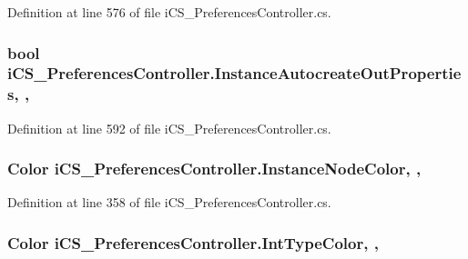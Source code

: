 Definition at line 576 of file i\+C\+S\+\_\+\+Preferences\+Controller.\+cs.

\hypertarget{classi_c_s___preferences_controller_a4496b861761f89fdc6a8647192368ead}{
\subsubsection[{Instance\+Autocreate\+Out\+Properties}]{\setlength{\rightskip}{0pt plus 5cm}bool i\+C\+S\+\_\+\+Preferences\+Controller.\+Instance\+Autocreate\+Out\+Properties\hspace{0.3cm}{\ttfamily [static]}, {\ttfamily [get]}, {\ttfamily [set]}}}\label{classi_c_s___preferences_controller_a4496b861761f89fdc6a8647192368ead}


Definition at line 592 of file i\+C\+S\+\_\+\+Preferences\+Controller.\+cs.

\hypertarget{classi_c_s___preferences_controller_aaf64f0db4d688dcc7c12a9711f04d04f}{
\subsubsection[{Instance\+Node\+Color}]{\setlength{\rightskip}{0pt plus 5cm}Color i\+C\+S\+\_\+\+Preferences\+Controller.\+Instance\+Node\+Color\hspace{0.3cm}{\ttfamily [static]}, {\ttfamily [get]}, {\ttfamily [set]}}}\label{classi_c_s___preferences_controller_aaf64f0db4d688dcc7c12a9711f04d04f}


Definition at line 358 of file i\+C\+S\+\_\+\+Preferences\+Controller.\+cs.

\hypertarget{classi_c_s___preferences_controller_a5e056119409ce6e8877cf05cf6d0d0de}{
\subsubsection[{Int\+Type\+Color}]{\setlength{\rightskip}{0pt plus 5cm}Color i\+C\+S\+\_\+\+Preferences\+Controller.\+Int\+Type\+Color\hspace{0.3cm}{\ttfamily [static]}, {\ttfamily [get]}, {\ttfamily [set]}}}\label{classi_c_s___preferences_controller_a5e056119409ce6e8877cf05cf6d0d0de}


